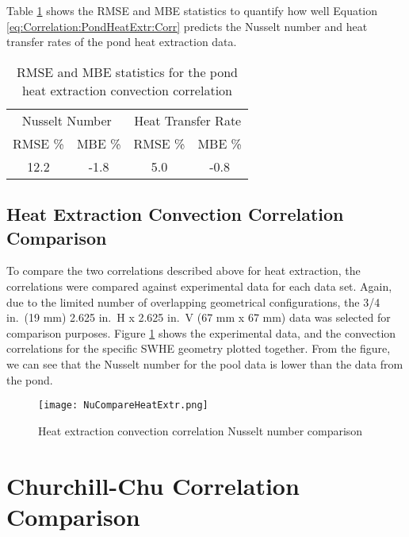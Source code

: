 Table \ref{tab:Correlation:PondHeatExtr:StatSummaryTable} shows the RMSE and MBE statistics to quantify how well Equation \ref{eq:Correlation:PondHeatExtr:Corr} predicts the Nusselt number and heat transfer rates of the pond heat extraction data. 

	\begin{table}[h]
		\centering
		\caption{RMSE and MBE statistics for the pond heat extraction convection correlation}
		\label{tab:Correlation:PondHeatExtr:StatSummaryTable}
		\begin{tabular}{c c c c}
		\hline
		\multicolumn{2}{c}{Nusselt Number} & \multicolumn{2}{c}{Heat Transfer Rate} \\
		RMSE \% & MBE \% & RMSE \% & MBE \% \\
		\hline\hline
		12.2 & -1.8 & 5.0 & -0.8 \\
		\hline		
		\end{tabular}
	\end{table}

\subsection{Heat Extraction Convection Correlation Comparison}
\label{subsec:Correlation:HeatExtrComparison}

To compare the two correlations described above for heat extraction, the correlations were compared against experimental data for each data set. Again, due to the limited number of overlapping geometrical configurations, the 3/4 in.\ (19 mm) 2.625 in.\ H x 2.625 in.\ V (67 mm x 67 mm) data was selected for comparison purposes. Figure \ref{fig:Correlation:HeatExtrComparison:NuCompare} shows the experimental data, and the convection correlations for the specific SWHE geometry plotted together. From the figure, we can see that the Nusselt number for the pool data is lower than the data from the pond. 


\begin{figure}
	\centering
	\texttt{[image: NuCompareHeatExtr.png]}
	\caption{Heat extraction convection correlation Nusselt number comparison}
	\label{fig:Correlation:HeatExtrComparison:NuCompare}
\end{figure}

\section{Churchill-Chu Correlation Comparison}
\label{sec:Corrleation:Churchill}

